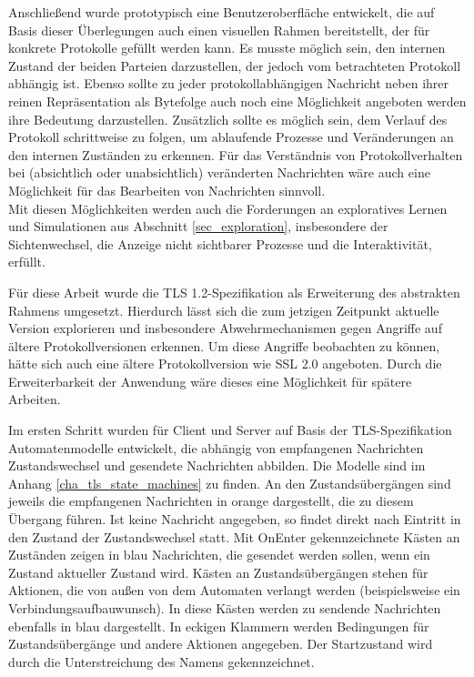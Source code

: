 Anschließend wurde prototypisch eine Benutzeroberfläche entwickelt, die auf Basis dieser Überlegungen auch einen visuellen Rahmen bereitstellt, der für konkrete Protokolle gefüllt werden kann.  Es musste möglich sein, den internen Zustand der beiden Parteien darzustellen, der jedoch vom betrachteten Protokoll abhängig ist. Ebenso sollte zu jeder protokollabhängigen Nachricht neben ihrer reinen Repräsentation als Bytefolge auch noch eine Möglichkeit angeboten werden ihre Bedeutung darzustellen. Zusätzlich sollte es möglich sein, dem Verlauf des Protokoll schrittweise zu folgen, um ablaufende Prozesse und Veränderungen an den internen Zuständen zu erkennen. Für das Verständnis von Protokollverhalten bei (absichtlich oder unabsichtlich) veränderten Nachrichten wäre auch eine Möglichkeit für das Bearbeiten von Nachrichten sinnvoll.\\
Mit diesen Möglichkeiten werden auch die Forderungen an exploratives Lernen und Simulationen aus Abschnitt \ref{sec_exploration}, insbesondere der Sichtenwechsel, die Anzeige nicht sichtbarer Prozesse und die Interaktivität, erfüllt.


Für diese Arbeit wurde die TLS 1.2-Spezifikation als Erweiterung des abstrakten Rahmens umgesetzt. Hierdurch lässt sich die zum jetzigen Zeitpunkt aktuelle Version explorieren und insbesondere Abwehrmechanismen gegen Angriffe auf ältere Protokollversionen erkennen. Um diese Angriffe beobachten zu können, hätte sich auch eine ältere Protokollversion wie SSL 2.0 angeboten. Durch die Erweiterbarkeit der Anwendung wäre dieses eine Möglichkeit für spätere Arbeiten.

Im ersten Schritt wurden für Client und Server auf Basis der TLS-Spezifikation Automatenmodelle entwickelt, die abhängig von empfangenen Nachrichten Zustandswechsel und gesendete Nachrichten abbilden. Die Modelle sind im Anhang \ref{cha_tls_state_machines} zu finden. An den Zustandsübergängen sind jeweils die empfangenen Nachrichten in orange dargestellt, die zu diesem Übergang führen. Ist keine Nachricht angegeben, so findet direkt nach Eintritt in den Zustand der Zustandswechsel statt. Mit OnEnter gekennzeichnete Kästen an Zuständen zeigen in blau Nachrichten, die gesendet werden sollen, wenn ein Zustand aktueller Zustand wird. Kästen an Zustandsübergängen stehen für Aktionen, die von außen von dem Automaten verlangt werden (beispielsweise ein Verbindungsaufbauwunsch). In diese Kästen werden zu sendende Nachrichten ebenfalls in blau dargestellt. In eckigen Klammern werden Bedingungen für Zustandsübergänge und andere Aktionen angegeben. Der Startzustand wird durch die Unterstreichung des Namens gekennzeichnet.
 
